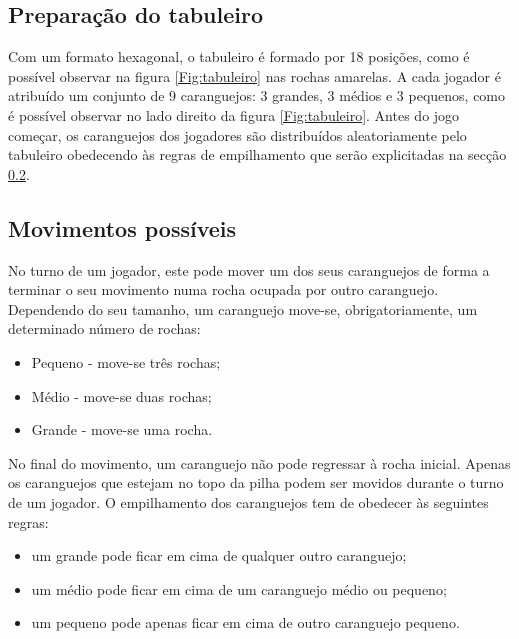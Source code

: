\documentclass[a4paper]{article}
\begin{document}
\subsection{Preparação do tabuleiro}

Com um formato hexagonal, o tabuleiro é formado por 18 posições, como é possível observar na figura \ref{Fig:tabuleiro} nas rochas amarelas.
\newline
A cada jogador é atribuído um conjunto de 9 caranguejos: 3 grandes, 3 médios e 3 pequenos, como é possível observar no lado direito da figura \ref{Fig:tabuleiro}.
\newline
Antes do jogo começar, os caranguejos dos jogadores são distribuídos aleatoriamente pelo tabuleiro obedecendo às regras de empilhamento que serão explicitadas na secção \ref{movimentos_caranguejo}.

\subsection{Movimentos possíveis} \label{movimentos_caranguejo}

No turno de um jogador, este pode mover um dos seus caranguejos de forma a terminar o seu movimento numa rocha ocupada por outro caranguejo. Dependendo do seu tamanho, um caranguejo move-se, obrigatoriamente, um determinado número de rochas:
\begin{itemize}
\item Pequeno - move-se três rochas;
\item Médio - move-se duas rochas;
\item Grande - move-se uma rocha.
\end{itemize}
No final do movimento, um caranguejo não pode regressar à rocha inicial.
\newline
Apenas os caranguejos que estejam no topo da pilha podem ser movidos durante o turno de um jogador.
\newline
O empilhamento dos caranguejos tem de obedecer às seguintes regras:
\begin{itemize}
\item um grande pode ficar em cima de qualquer outro caranguejo;
\item um médio pode ficar em cima de um caranguejo médio ou pequeno;
\item um pequeno pode apenas ficar em cima de outro caranguejo pequeno.
\end{itemize}
\end{document}
